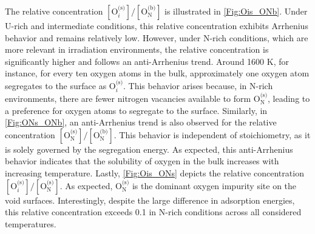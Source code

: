 \documentclass[preprint,12pt,sort&compress]{elsarticle}
\newcommand{\?}{\stackrel{?}{=}}
\begin{document}
The relative concentration $ [ \text{O}_i^\text{(s)} ] / [ \text{O}_\text{N}^\text{(b)} ] $ is illustrated in \cref{Fig:Ois_ONb}. Under U-rich and intermediate conditions, this relative concentration exhibits Arrhenius behavior and remains relatively low. However, under N-rich conditions, which are more relevant in irradiation environments, the relative concentration is significantly higher and follows an anti-Arrhenius trend. Around 1600 K, for instance, for every ten oxygen atoms in the bulk, approximately one oxygen atom segregates to the surface as $ \text{O}_i^\text{(s)} $. This behavior arises because, in N-rich environments, there are fewer nitrogen vacancies available to form $ \text{O}_\text{N}^\text{(s)} $, leading to a preference for oxygen atoms to segregate to the surface. Similarly, in \cref{Fig:ONs_ONb}, an anti-Arrhenius trend is also observed for the relative concentration $ [ \text{O}_\text{N}^\text{(s)} ] / [ \text{O}_\text{N}^\text{(b)} ] $. This behavior is independent of stoichiometry, as it is solely governed by the segregation energy. As expected, this anti-Arrhenius behavior indicates that the solubility of oxygen in the bulk increases with increasing temperature. Lastly, \cref{Fig:Ois_ONs} depicts the relative concentration $ [ \text{O}_i^\text{(s)} ] / [ \text{O}_\text{N}^\text{(s)} ] $. As expected, $ \text{O}_\text{N}^\text{(s)} $ is the dominant oxygen impurity site on the void surfaces. Interestingly, despite the large difference in adsorption energies, this relative concentration exceeds 0.1 in N-rich conditions across all considered temperatures.

\end{document}
